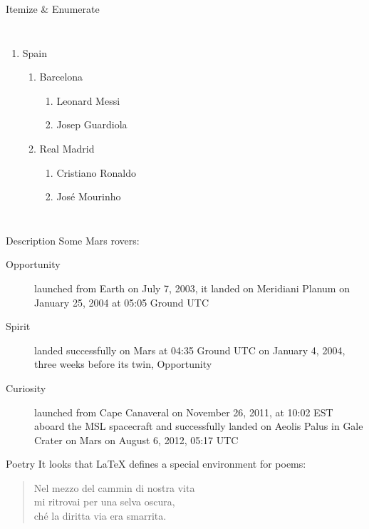 \begin{frame}{Itemize \& Enumerate}
\begin{columns}
\begin{enumerate}
\item Spain
      \begin{enumerate}
      \item Barcelona
            \begin{enumerate}
            \item Leonard Messi
            \item Josep Guardiola
            \end{enumerate}
      \item Real Madrid
            \begin{enumerate}
            \item Cristiano Ronaldo
            \item José Mourinho
            \end{enumerate}
      \end{enumerate}
\end{enumerate}
\end{columns}
\end{frame}

\begin{frame}{Description}
Some Mars rovers:

\begin{description}
\item[Opportunity] launched from Earth on July 7, 2003, it landed on Meridiani
                   Planum on January 25, 2004 at 05:05 Ground UTC
\item[Spirit] landed successfully on Mars at 04:35 Ground UTC on January 4,
              2004, three weeks before its twin, Opportunity
\item[Curiosity] launched from Cape Canaveral on November 26, 2011, at 10:02 EST
                 aboard the MSL spacecraft and successfully landed on Aeolis
                 Palus in Gale Crater on Mars on August 6, 2012, 05:17 UTC
\end{description}
\end{frame}

\begin{frame}{Poetry}
It looks that \LaTeX{} defines a special environment for poems:

\begin{verse}
Nel mezzo del cammin di nostra vita \\
mi ritrovai per una selva oscura, \\
ché la diritta via era smarrita.
\end{verse}

\end{frame}

